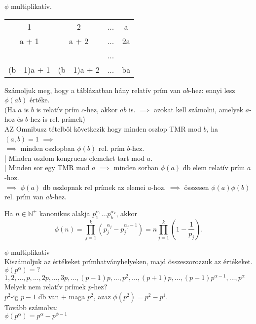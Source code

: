 \documentclass{beamer}
\begin{document}
\begin{frame}
\begin{tcolorbox}[title={Tétel: $\phi$ multiplikativitása}]
$\phi$ multiplikatív.
\end{tcolorbox}

\begin{tcolorbox}[title={Bizonyítás}]
\smallskip
\begin{tabular}{c c c c}
1 & 2 & ... & a \\
a + 1 & a + 2 & ... & 2a\\
 &  & ... &  \\
(b - 1)a + 1 & (b - 1)a + 2 & ... & ba
\end{tabular}
\smallskip
Számoljuk meg, hogy a táblázatban hány relatív prím van $ab$-hez: ennyi lesz ${\phi}(ab)$ értéke.\\
(Ha $a$ is $b$ is relatív prím $c$-hez, akkor $ab$ is. $\implies$ azokat kell számolni, amelyek $a$-hoz és $b$-hez is rel. prímek)\\
\smallskip
AZ Omnibusz tételből következik hogy minden oszlop TMR mod $b$, ha $(a, b) = 1$ $\implies$\\
$\implies$ minden oszlopban ${\phi}(b)$ rel. prím $b$-hez.\\
\smallskip
| Minden oszlom kongruens elemeket tart mod $a$.\\
| Minden sor egy TMR mod $a$ $\implies$ minden sorban ${\phi}(a)$ db elem relatív prím $a$-hoz.\\
$\implies$ ${\phi}(a)$ db oszlopnak rel prímek az elemei $a$-hoz. $\implies$ összesen ${\phi}(a){\phi}(b)$ rel. prím van $ab$-hez.
\end{tcolorbox}
\end{frame}

\begin{frame}
\begin{tcolorbox}[title={Tétel: ${\phi}$(n) kiszámolása}]
Ha $n \in \mathbb{N}^+$ kanonikus alakja $p_1^{{\alpha}_1}...p_k^{{\alpha}_k}$, akkor\\
$${\phi}(n) = \prod^k_{j=1} (p_j^{{\alpha}_j} - p_j^{{\alpha}_j - 1}) = n \prod^k_{j=1} (1 - \frac{1}{p_j}).$$
\end{tcolorbox}

\begin{tcolorbox}[title={Bizonyítás}]
$\phi$ multiplikatív\\
Kiszámoljuk az értékeket prímhatványhelyeken, majd összeszorozzuk az értékeket.\\
${\phi}(p^{\alpha}) = ?$\\
$1, 2, ..., p, ..., 2p, ..., 3p, ..., (p-1)p, ..., p^2, ..., (p+1)p, ..., (p-1)p^{{\alpha}-1}, ..., p^{\alpha}$\\
Melyek nem relatív prímek $p$-hez?\\
\smallskip
$p^2$-ig $p - 1$ db van + maga $p^2$, azaz ${\phi}(p^2) = p^2 - p^1$.\\
Tovább számolva:\\
${\phi}(p^{\alpha}) = p^{\alpha} - p^{\phi - 1}$
\end{tcolorbox}
\end{frame}
\end{document}
